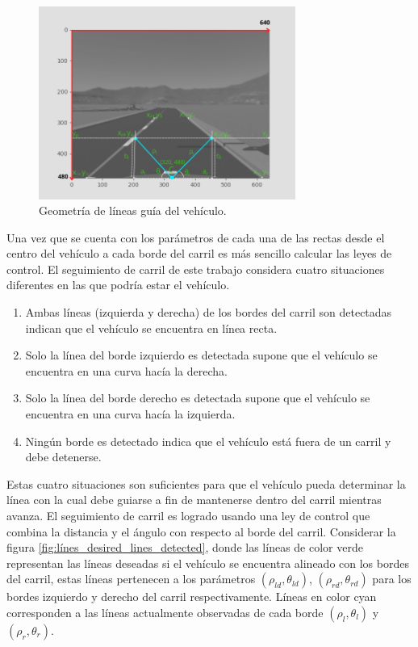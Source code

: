\begin{figure}[h]
    \centering
    \includegraphics[width=0.75\textwidth]{Figures/Figures_Cap04/avg_polar_lines.png}
    \caption{Geometría de líneas guía del vehículo.}
    \label{fig:avg_polar_lines}
\end{figure}

Una vez que se cuenta con los parámetros de cada una de las rectas desde el centro del vehículo a cada borde del carril es más sencillo calcular las leyes de control. El seguimiento de carril de este trabajo considera cuatro situaciones diferentes en las que podría estar el vehículo.
\begin{enumerate}
    \item Ambas líneas (izquierda y derecha) de los bordes del carril son detectadas indican que el vehículo se encuentra en línea recta.
    \item Solo la línea del borde izquierdo es detectada supone que el vehículo se encuentra en una curva hacía la derecha.
    \item Solo la línea del borde derecho es detectada supone que el vehículo se encuentra en una curva hacía la izquierda.
    \item Ningún borde es detectado indica que el vehículo está fuera de un carril y debe detenerse.
\end{enumerate}

Estas cuatro situaciones son suficientes para que el vehículo pueda determinar la línea con la cual debe guiarse a fin de mantenerse dentro del carril mientras avanza. El seguimiento de carril es logrado usando una ley de control que combina la distancia y el ángulo con respecto al borde del carril. Considerar la figura \ref{fig:línes_desired_lines_detected}, donde las líneas de color verde representan las líneas deseadas si el vehículo se encuentra alineado con los bordes del carril, estas líneas pertenecen a los parámetros $(\rho_{ld}, \theta_{ld})$, $(\rho_{rd}, \theta_{rd})$ para los bordes izquierdo y derecho del carril respectivamente. Líneas en color cyan corresponden a las líneas actualmente observadas de cada borde $(\rho_{l}, \theta_{l})$ y $(\rho_{r}, \theta_{r})$.

